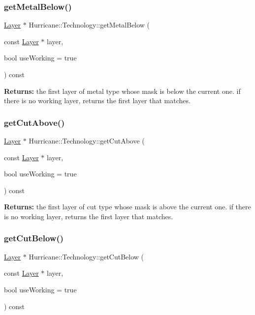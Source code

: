 \subsubsection{\texorpdfstring{get\+Metal\+Below()}{getMetalBelow()}}
{\footnotesize\ttfamily \hyperlink{classHurricane_1_1Layer}{Layer} $\ast$ Hurricane\+::\+Technology\+::get\+Metal\+Below (\begin{DoxyParamCaption}\item[{const \hyperlink{classHurricane_1_1Layer}{Layer} $\ast$}]{layer,  }\item[{bool}]{use\+Working = {\ttfamily true} }\end{DoxyParamCaption}) const}

{\bfseries Returns\+:} the first layer of metal type whose mask is below the current one. if there is no working layer, returns the first layer that matches. \mbox{\label{classHurricane_1_1Technology_ac7125a8eea871918e74bb295c56caceb}} 
\subsubsection{\texorpdfstring{get\+Cut\+Above()}{getCutAbove()}}
{\footnotesize\ttfamily \hyperlink{classHurricane_1_1Layer}{Layer} $\ast$ Hurricane\+::\+Technology\+::get\+Cut\+Above (\begin{DoxyParamCaption}\item[{const \hyperlink{classHurricane_1_1Layer}{Layer} $\ast$}]{layer,  }\item[{bool}]{use\+Working = {\ttfamily true} }\end{DoxyParamCaption}) const}

{\bfseries Returns\+:} the first layer of cut type whose mask is above the current one. if there is no working layer, returns the first layer that matches. \mbox{\label{classHurricane_1_1Technology_a3ca39dccc7e19b404181f55777e1b933}} 
\subsubsection{\texorpdfstring{get\+Cut\+Below()}{getCutBelow()}}
{\footnotesize\ttfamily \hyperlink{classHurricane_1_1Layer}{Layer} $\ast$ Hurricane\+::\+Technology\+::get\+Cut\+Below (\begin{DoxyParamCaption}\item[{const \hyperlink{classHurricane_1_1Layer}{Layer} $\ast$}]{layer,  }\item[{bool}]{use\+Working = {\ttfamily true} }\end{DoxyParamCaption}) const}

